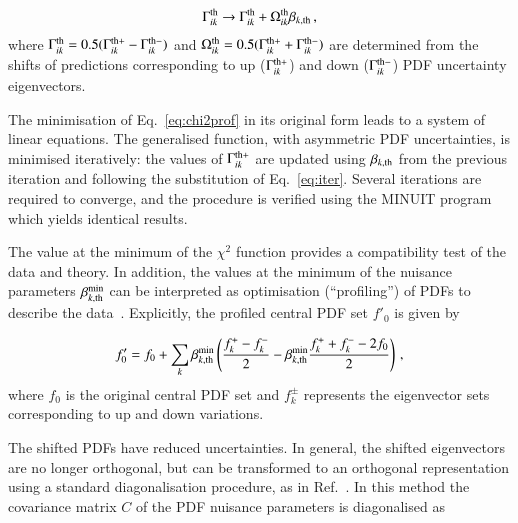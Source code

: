 \begin{eqnarray}
   \Gamma^{\rm th}_{ik} \to \Gamma^{\rm th}_{ik} +  \Omega^{\rm th}_{ik}\beta_{k, \rm th}\,, \label{eq:iter}
\end{eqnarray}
where $\Gamma^{\rm th}_{ik} = 0.5(\Gamma^{\rm th+}_{ik} - \Gamma^{\rm
th-}_{ik})$ and $\Omega^{\rm th}_{ik} = 0.5(\Gamma^{\rm th+}_{ik}
+ \Gamma^{\rm th-}_{ik})$ are determined from the shifts of
predictions corresponding to up ($\Gamma^{\rm th+}_{ik}$) and down
($ \Gamma^{\rm th-}_{ik}$) PDF uncertainty eigenvectors.

The minimisation of Eq.~\ref{eq:chi2prof} in its original form leads
to a system of linear equations. The generalised function, with
asymmetric PDF uncertainties, is minimised iteratively: the values of $\Gamma^{\rm
th+}_{ik}$ are updated using $\beta_{k, \rm th}$ from the
previous iteration and following the substitution of Eq.~\ref{eq:iter}.
Several iterations are required to converge, and the procedure is verified
using the MINUIT program which yields identical results.

The value at the minimum of the $\chi^2$ function provides a
compatibility test of the data and theory.
In addition, the values at the minimum of the nuisance parameters
$\beta^{\rm min}_{k,\rm th}$ can be interpreted as optimisation
(``profiling'') of PDFs to describe the data~\cite{Paukkunen:2014zia}. Explicitly, the profiled
central PDF set $f'_0$ is given by

\begin{equation}
   f'_0 = f_0 + \sum_k  \beta^{\rm min}_{k, {\rm
   th}} \left( \frac{f^{+}_k - f^{-}_k}{2}  - \beta^{\rm min}_{k, {\rm th}}  \frac{f^{+}_k + f^{-}_k - 2f_0}{2} \right)\,, \label{eq:prof}
\end{equation}
where $f_0$ is the original central PDF set and $f^{\pm}_k$ represents the
eigenvector sets corresponding to up and down variations.

The shifted PDFs have reduced uncertainties. In general, the
shifted eigenvectors are no longer orthogonal, but can be transformed
to an orthogonal representation using a standard diagonalisation
procedure, as in Ref.~\cite{Aaron:2009bp}.
In this method the covariance matrix $C$ of the PDF nuisance
parameters is diagonalised as

